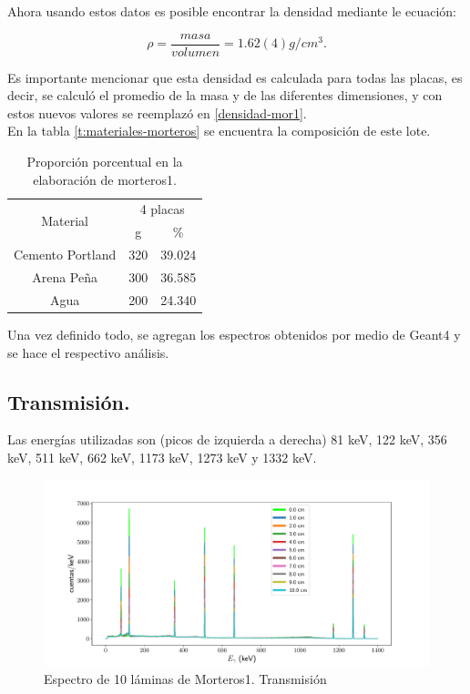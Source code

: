 Ahora usando estos datos es posible encontrar la densidad mediante le ecuación:

\begin{equation} \label{densidad-mor1}
	\rho=\frac{masa}{volumen}=1.62(4) g/cm^3 .
\end{equation}

Es importante mencionar que esta densidad es calculada para todas las placas, es decir, se calculó el promedio de la masa y de las diferentes dimensiones, y con estos nuevos valores se reemplazó en \ref{densidad-mor1}. \\

En la tabla  \ref{t:materiales-morteros} se encuentra la composición de este lote.

\begin{table}[H]
	\centering
	\begin{tabular}{|c|c|c|}
		\hline
		\multirow{2}{*}{Material} & \multicolumn{2}{c|}{4 placas} \\ \cline{2-3}
		& g         	& \%        	\\ \hline
		Cemento Portland      	& 320      	& 39.024    	\\ \hline
		Arena Peña         	& 300      	& 36.585    	\\ \hline
		Agua                  	& 200     	& 24.340     	\\ \hline
	\end{tabular}
	\caption{Proporción porcentual en la elaboración de morteros1.}
	\label{t:materiales-morteros1}
\end{table}

Una vez definido todo, se agregan los espectros obtenidos por medio de Geant4 y se hace el respectivo análisis.

\subsection{Transmisión.}
Las energías utilizadas son (picos de izquierda a derecha) 81 keV, 122 keV, 356 keV, 511 keV, 662 keV, 1173 keV, 1273 keV y 1332 keV.
  
\begin{figure}[H]
	\centering
	\includegraphics[width=1.0\linewidth]{Kap4/espectro_m1-10M-trans.pdf}
	\caption{Espectro de 10 láminas de Morteros1. Transmisión}
	\label{fig:espectrom1-10m-trans}
\end{figure}


